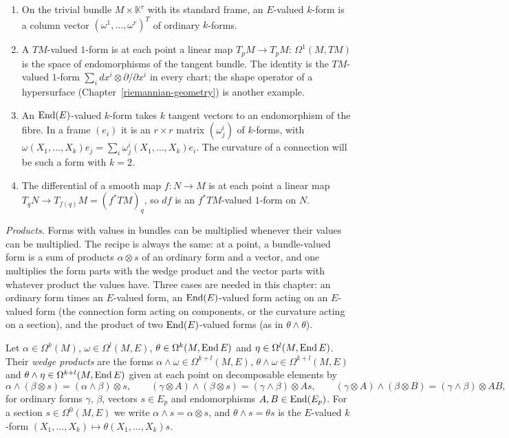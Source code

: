 \begin{example}\label{connections:example-bundle-valued-forms}
\begin{enumerate}
\item On the trivial bundle $M \times \mathbb{K}^r$ with its standard frame, an $E$-valued $k$-form is a column vector $(\omega^1, \ldots, \omega^r)^T$ of ordinary $k$-forms.
\item A $TM$-valued $1$-form is at each point a linear map $T_pM \to T_pM$: $\Omega^1(M, TM)$ is the space of endomorphisms of the tangent bundle. The identity is the
$TM$-valued $1$-form $\sum_idx^i \otimes \partial/\partial x^i$ in every chart; the shape operator of a hypersurface (Chapter~\ref{riemannian-geometry}) is another example.
\item An $\operatorname{End}(E)$-valued $k$-form takes $k$ tangent vectors to an endomorphism of the fibre. In a frame $(e_i)$ it is an $r \times r$ matrix $(\omega^i_j)$ of $k$-forms, with
$\omega(X_1, \ldots, X_k)e_j = \sum_i\omega^i_j(X_1, \ldots, X_k)e_i$. The curvature of a connection will be such a form with $k = 2$.
\item The differential of a smooth map $f \colon N \to M$ is at each point a linear map $T_qN \to T_{f(q)}M = (f^*TM)_q$, so $df$ is an $f^*TM$-valued $1$-form on $N$.
\end{enumerate}
\end{example}

\emph{Products.} Forms with values in bundles can be multiplied whenever their values can be multiplied. The recipe is always the same: at a point, a bundle-valued form is a sum of
products $\alpha \otimes s$ of an ordinary form and a vector, and one multiplies the form parts with the wedge product and the vector parts with whatever product the values have. Three
cases are needed in this chapter: an ordinary form times an $E$-valued form, an $\operatorname{End}(E)$-valued form acting on an $E$-valued form (the connection form acting on components, or the
curvature acting on a section), and the product of two $\operatorname{End}(E)$-valued forms (as in $\theta \wedge \theta$).

\begin{definition}\label{connections:definition-products}
Let $\alpha \in \Omega^k(M)$, $\omega \in \Omega^l(M, E)$, $\theta \in \Omega^k(M, \operatorname{End} E)$ and $\eta \in \Omega^l(M, \operatorname{End} E)$. Their \emph{wedge products} are the forms
$\alpha \wedge \omega \in \Omega^{k+l}(M, E)$, $\theta \wedge \omega \in \Omega^{k+l}(M, E)$ and $\theta \wedge \eta \in \Omega^{k+l}(M, \operatorname{End} E)$ given at each point on decomposable elements by
\[
\alpha \wedge (\beta \otimes s) = (\alpha \wedge \beta) \otimes s, \qquad (\gamma \otimes A) \wedge (\beta \otimes s) = (\gamma \wedge \beta) \otimes As, \qquad (\gamma \otimes A) \wedge (\beta \otimes B) = (\gamma \wedge \beta) \otimes AB,
\]
for ordinary forms $\gamma$, $\beta$, vectors $s \in E_p$ and endomorphisms $A, B \in \operatorname{End}(E_p)$. For a section $s \in \Omega^0(M, E)$ we write $\alpha \wedge s = \alpha \otimes s$, and $\theta \wedge s = \theta s$
is the $E$-valued $k$-form $(X_1, \ldots, X_k) \mapsto \theta(X_1, \ldots, X_k)s$.
\end{definition}

